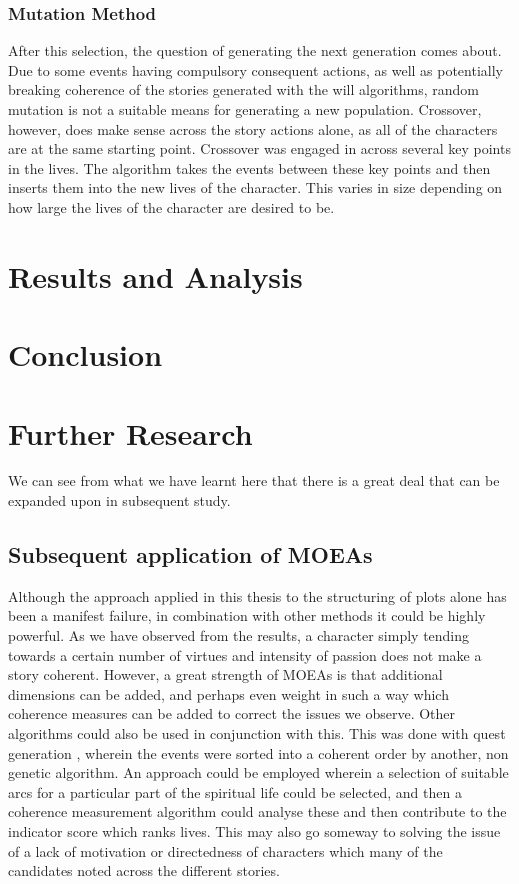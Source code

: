 \documentclass[12pt]{article}
\begin{document}
\subsubsection{Mutation Method}
After this selection, the question of generating the next generation comes about. Due to some events having compulsory consequent actions, as well as potentially breaking coherence of the stories generated with the will algorithms, random mutation is not a suitable means for generating a new population. Crossover, however, does make sense across the story actions alone, as all of the characters are at the same starting point. Crossover was engaged in across several key points in the lives. The algorithm takes the events between these key points and then inserts them into the new lives of the character. This varies in size depending on how large the lives of the character are desired to be. 


\section{Results and Analysis}

\section{Conclusion}

\section{Further Research}
We can see from what we have learnt here that there is a great deal that can be expanded upon in subsequent study. 

\subsection{Subsequent application of MOEAs}
Although the approach applied in this thesis to the structuring of plots alone has been a manifest failure, in combination with other methods it could be highly powerful. As we have observed from the results, a character simply tending towards a certain number of virtues and intensity of passion does not make a story coherent. However, a great strength of MOEAs is that additional dimensions can be added, and perhaps even weight in such a way which coherence measures can be added to correct the issues we observe. Other algorithms could also be used in conjunction with this. This was done with quest generation \cite{questgeneration}, wherein the events were sorted into a coherent order by another, non genetic algorithm. An approach could be employed wherein a selection of suitable arcs for a particular part of the spiritual life could be selected, and then a coherence measurement algorithm could analyse these and then contribute to the indicator score which ranks lives. This may also go someway to solving the issue of a lack of motivation or directedness of characters which many of the candidates noted across the different stories. 
\end{document}
